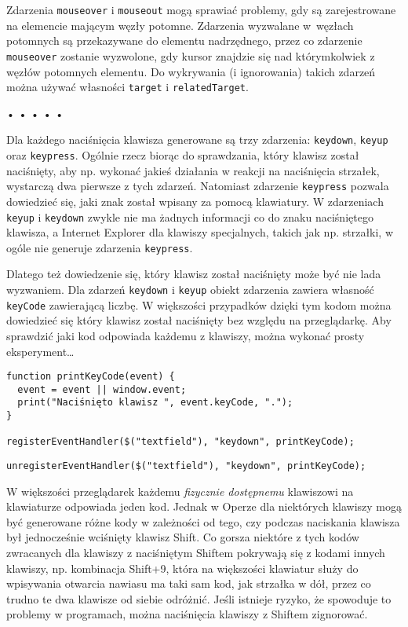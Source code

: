   
Zdarzenia \texttt{mouseover} i \texttt{mouseout} mogą sprawiać problemy, gdy są zarejestrowane na elemencie mającym węzły potomne. Zdarzenia wyzwalane w~węzłach potomnych są przekazywane do elementu nadrzędnego, przez co zdarzenie \texttt{mouseover} zostanie wyzwolone, gdy kursor znajdzie się nad którymkolwiek z węzłów potomnych elementu. Do wykrywania (i ignorowania) takich zdarzeń można używać własności \texttt{target} i \texttt{relatedTarget}.



\begin{center}
• • • • •
\end{center}

  
Dla każdego naciśnięcia klawisza generowane są trzy zdarzenia: \texttt{keydown}, \texttt{keyup} oraz \texttt{keypress}. Ogólnie rzecz biorąc do sprawdzania, który klawisz został naciśnięty, aby np. wykonać jakieś działania w reakcji na naciśnięcia strzałek, wystarczą dwa pierwsze z tych zdarzeń. Natomiast zdarzenie \texttt{keypress} pozwala dowiedzieć się, jaki znak został wpisany za pomocą klawiatury. W zdarzeniach \texttt{keyup} i \texttt{keydown} zwykle nie ma żadnych informacji co do znaku naciśniętego klawisza, a Internet Explorer dla klawiszy specjalnych, takich jak np. strzałki, w ogóle nie generuje zdarzenia \texttt{keypress}.

  
Dlatego też dowiedzenie się, który klawisz został naciśnięty może być nie lada wyzwaniem. Dla zdarzeń \texttt{keydown} i \texttt{keyup} obiekt zdarzenia zawiera  własność \texttt{keyCode} zawierającą liczbę. W większości przypadków dzięki tym kodom można dowiedzieć się który klawisz został naciśnięty bez względu na przeglądarkę. Aby sprawdzić jaki kod odpowiada każdemu z klawiszy, można wykonać prosty eksperyment…

  
\begin{verbatim} 
function printKeyCode(event) {
  event = event || window.event;
  print("Naciśnięto klawisz ", event.keyCode, ".");
}

registerEventHandler($("textfield"), "keydown", printKeyCode);
 \end{verbatim}
  
\begin{verbatim} 
unregisterEventHandler($("textfield"), "keydown", printKeyCode);
 \end{verbatim}
  
W większości przeglądarek każdemu \emph{fizycznie dostępnemu} klawiszowi na klawiaturze odpowiada jeden kod. Jednak w Operze dla niektórych klawiszy mogą być generowane różne kody w zależności od tego, czy podczas naciskania klawisza był jednocześnie wciśnięty klawisz Shift. Co gorsza niektóre z tych kodów zwracanych dla klawiszy z naciśniętym Shiftem pokrywają się z kodami innych klawiszy, np. kombinacja Shift+9, która na większości klawiatur służy do wpisywania otwarcia nawiasu ma taki sam kod, jak strzałka w dół, przez co trudno te dwa klawisze od siebie odróżnić. Jeśli istnieje ryzyko, że spowoduje to problemy w programach, można naciśnięcia klawiszy z Shiftem zignorować.

